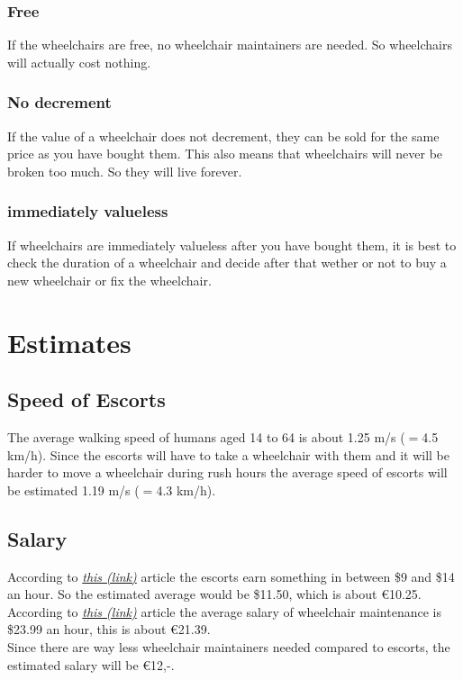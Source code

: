 \documentclass[a4paper, 11pt, notitlepage]{report}
\begin{document}
\subsubsection{Free}
If the wheelchairs are free, no wheelchair maintainers are needed. So wheelchairs will actually cost nothing.
\subsubsection{No decrement}
If the value of a wheelchair does not decrement, they can be sold for the same price as you have bought them. This also means that wheelchairs will never be broken too much. So they will live forever.
\subsubsection{immediately valueless}
If wheelchairs are immediately valueless after you have bought them, it is best to check the duration of a wheelchair and decide after that wether or not to buy a new wheelchair or fix the wheelchair.
\section{Estimates}
    \subsection{Speed of Escorts}
    The average walking speed of humans aged 14 to 64 is about 1.25 m/s  ($=$4.5 km/h). Since the escorts will have to take a wheelchair with them and it will be harder to move a wheelchair during rush hours the average speed of escorts will be estimated 1.19 m/s ($=$4.3 km/h).
    \subsection{Salary}
    According to \href{https://disabledaccessdenied.wordpress.com/2012/10/08/airport-wheelchair-fakes-are-making-life-hard-for-disabled-travellers/}{\emph{this (link)}} article the escorts earn something in between \$9 and \$14 an hour. So the estimated average would be \$11.50, which is about \euro{10.25}.\\
    According to \href{http://work.chron.com/average-wage-wheelchair-repair-19790.html}{\emph{this (link)}} article the average salary of wheelchair maintenance is \$23.99 an hour, this is about \euro{21.39}.\\
    Since there are way less wheelchair maintainers needed compared to escorts, the estimated salary will be \euro{12,-}.
\end{document}
